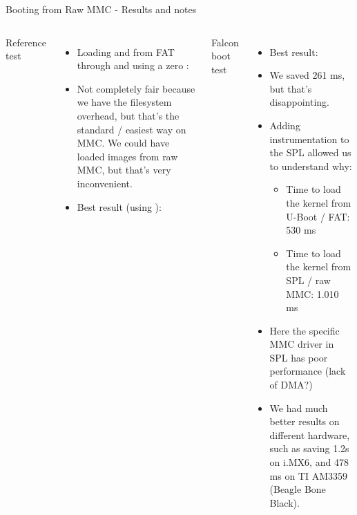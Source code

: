 \begin{frame}{Booting from Raw MMC - Results and notes}
  \scriptsize
  \begin{columns}
         Reference test
	\begin{itemize}
           \item Loading  and  from FAT through
                  and using a zero :\\
	   \item Not completely fair because we have the filesystem overhead, but that's the standard / easiest way on MMC.
		 We could have loaded images from raw MMC, but that's very inconvenient.
	   \item Best result (using ):\\
	\end{itemize}
        Falcon boot test
	\begin{itemize}
	   \item Best result:\\
	   \item We saved 261 ms, but that's disappointing.
	   \item Adding instrumentation to the SPL allowed us to understand why:
	   \begin{itemize}
	      \scriptsize
	      \item Time to load the kernel from U-Boot / FAT: 530 ms
	      \item Time to load the kernel from SPL / raw MMC: 1.010 ms
	   \end{itemize}
	   \item Here the specific MMC driver in SPL has poor performance (lack
		 of DMA?)
           \item We had much better results on different hardware, such
	         as saving 1.2s on i.MX6, and 478 ms on TI AM3359
                 (Beagle Bone Black).
	\end{itemize}
  \end{columns}
\end{frame}

